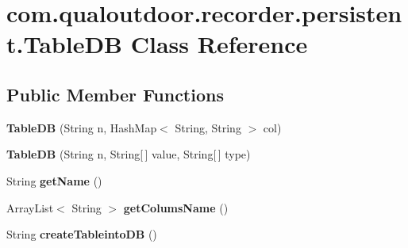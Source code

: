 \hypertarget{classcom_1_1qualoutdoor_1_1recorder_1_1persistent_1_1TableDB}{\section{com.\-qualoutdoor.\-recorder.\-persistent.\-Table\-D\-B Class Reference}
\label{classcom_1_1qualoutdoor_1_1recorder_1_1persistent_1_1TableDB}
}
\subsection*{Public Member Functions}
\begin{DoxyCompactItemize}
\item 
\hypertarget{classcom_1_1qualoutdoor_1_1recorder_1_1persistent_1_1TableDB_a35b816455264c9bc9d29c7fa80f5684f}{{\bfseries Table\-D\-B} (String n, Hash\-Map$<$ String, String $>$ col)}\label{classcom_1_1qualoutdoor_1_1recorder_1_1persistent_1_1TableDB_a35b816455264c9bc9d29c7fa80f5684f}

\item 
\hypertarget{classcom_1_1qualoutdoor_1_1recorder_1_1persistent_1_1TableDB_a54acba5469b3495e09849809f4e2a618}{{\bfseries Table\-D\-B} (String n, String\mbox{[}$\,$\mbox{]} value, String\mbox{[}$\,$\mbox{]} type)}\label{classcom_1_1qualoutdoor_1_1recorder_1_1persistent_1_1TableDB_a54acba5469b3495e09849809f4e2a618}

\item 
\hypertarget{classcom_1_1qualoutdoor_1_1recorder_1_1persistent_1_1TableDB_a272cb584a46bb3496f5b274e57f2cedb}{String {\bfseries get\-Name} ()}\label{classcom_1_1qualoutdoor_1_1recorder_1_1persistent_1_1TableDB_a272cb584a46bb3496f5b274e57f2cedb}

\item 
\hypertarget{classcom_1_1qualoutdoor_1_1recorder_1_1persistent_1_1TableDB_a93b4638c7be8e9fe72f4780edcadd21b}{Array\-List$<$ String $>$ {\bfseries get\-Colums\-Name} ()}\label{classcom_1_1qualoutdoor_1_1recorder_1_1persistent_1_1TableDB_a93b4638c7be8e9fe72f4780edcadd21b}

\item 
\hypertarget{classcom_1_1qualoutdoor_1_1recorder_1_1persistent_1_1TableDB_a336189888dc07a47c003c0e65931e47b}{String {\bfseries create\-Tableinto\-D\-B} ()}\label{classcom_1_1qualoutdoor_1_1recorder_1_1persistent_1_1TableDB_a336189888dc07a47c003c0e65931e47b}

\end{DoxyCompactItemize}
